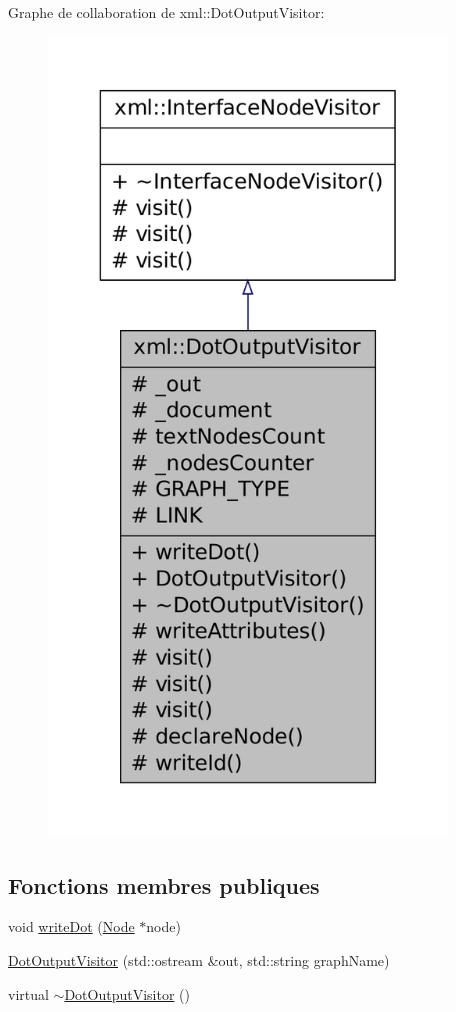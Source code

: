 Graphe de collaboration de xml::DotOutputVisitor:\nopagebreak
\begin{figure}[H]
\begin{center}
\leavevmode
\includegraphics[height=600pt]{classxml_1_1_dot_output_visitor__coll__graph}
\end{center}
\end{figure}
\subsection*{Fonctions membres publiques}
\begin{DoxyCompactItemize}
\item 
void \hyperlink{classxml_1_1_dot_output_visitor_a329cc7e31f291ccbebf5029325321ee0}{writeDot} (\hyperlink{classxml_1_1_node}{Node} $\ast$node)
\item 
\hyperlink{classxml_1_1_dot_output_visitor_a572e83719b4820a194c8094fd283caea}{DotOutputVisitor} (std::ostream \&out, std::string graphName)
\item 
virtual \hyperlink{classxml_1_1_dot_output_visitor_a58f12e15968fb6d1d66853b8106212fe}{$\sim$DotOutputVisitor} ()
\end{DoxyCompactItemize}
